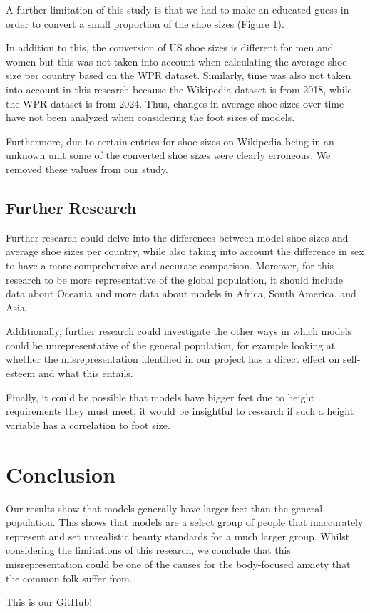 \documentclass{article}
\begin{document}
A further limitation of this study is that we had to make an educated guess in order to convert a small proportion of the shoe sizes (Figure 1).

In addition to this, the conversion of US shoe sizes is different for men and women but this was not taken into account when calculating the average shoe size per country based on the WPR dataset. Similarly, time was also not taken into account in this research because the Wikipedia dataset is from 2018, while the WPR dataset is from 2024. Thus, changes in average shoe sizes over time have not been analyzed when considering the foot sizes of models. 
	
Furthermore, due to certain entries for shoe sizes on Wikipedia being in an unknown unit some of the converted shoe sizes were clearly erroneous. We removed these values from our study. 

\subsection{Further Research}
Further research could delve into the differences between model shoe sizes and average shoe sizes per country, while also taking into account the difference in sex to have a more comprehensive and accurate comparison. Moreover, for this research to be more representative of the global population, it should include data about Oceania and more data about models in Africa, South America, and Asia.

Additionally, further research could investigate the other ways in which models could be unrepresentative of the general population, for example looking at whether the misrepresentation identified in our project has a direct effect on self-esteem and what this entails. 

Finally, it could be possible that models have bigger feet due to height requirements they must meet, it would be insightful to research if such a height variable has a correlation to foot size.

\section{Conclusion}
Our results show that models generally have larger feet than the general population. This shows that models are a select group of people that inaccurately represent and set unrealistic beauty standards for a much larger group. Whilst considering the limitations of this research, we conclude that this misrepresentation could be one of the causes for the body-focused anxiety that the common folk suffer from. 

\href {https://github.com/luciehoeberichts/LaTexLovers.git}{This is our GitHub!}
\end{document}
